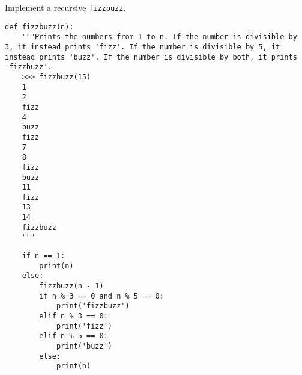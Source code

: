 \begin{blocksection}
\question Implement a recursive \lstinline$fizzbuzz$.

\begin{lstlisting}
def fizzbuzz(n):
    """Prints the numbers from 1 to n. If the number is divisible by 3, it instead prints 'fizz'. If the number is divisible by 5, it instead prints 'buzz'. If the number is divisible by both, it prints 'fizzbuzz'.
    >>> fizzbuzz(15)
    1
    2
    fizz
    4
    buzz
    fizz
    7
    8
    fizz
    buzz
    11
    fizz
    13
    14
    fizzbuzz
    """
\end{lstlisting}

\begin{solution}[1.5in]
\begin{lstlisting}
    if n == 1:
        print(n)
    else:
        fizzbuzz(n - 1)
        if n % 3 == 0 and n % 5 == 0:
            print('fizzbuzz')
        elif n % 3 == 0:
            print('fizz')
        elif n % 5 == 0:
            print('buzz')
        else:
            print(n)
\end{lstlisting}
\end{solution}
\end{blocksection}
